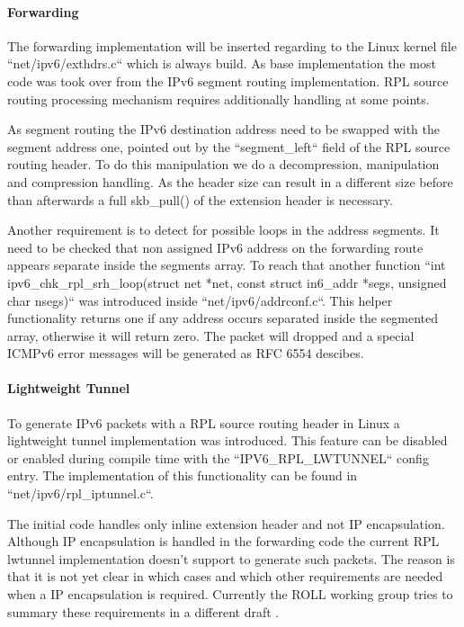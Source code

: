 \documentclass[letterpaper]{article}
\begin{document}
\paragraph{Forwarding}

The forwarding implementation will be inserted regarding to the Linux kernel file ``net/ipv6/exthdrs.c`` which is always build.
As base implementation the most code was took over from the IPv6 segment routing implementation.
RPL source routing processing mechanism requires additionally handling at some points.

As segment routing the IPv6 destination address need to be swapped with the segment address one, pointed out by the ``segment\_left`` field of the RPL source routing header.
To do this manipulation we do a decompression, manipulation and compression handling.
As the header size can result in a different size before than afterwards a full skb\_pull() of the extension header is necessary.

Another requirement is to detect for possible loops in the address segments.
It need to be checked that non assigned IPv6 address on the forwarding route appears separate inside the segments array.
To reach that another function ``int ipv6\_chk\_rpl\_srh\_loop(struct net *net, const struct in6\_addr *segs, unsigned char nsegs)`` was introduced inside ``net/ipv6/addrconf.c``.
This helper functionality returns one if any address occurs separated inside the segmented array, otherwise it will return zero.
The packet will dropped and a special ICMPv6 error messages will be generated as RFC 6554 descibes.

\paragraph{Lightweight Tunnel}

To generate IPv6 packets with a RPL source routing header in Linux a lightweight tunnel implementation was introduced.
This feature can be disabled or enabled during compile time with the ``IPV6\_RPL\_LWTUNNEL`` config entry.
The implementation of this functionality can be found in ``net/ipv6/rpl\_iptunnel.c``.

The initial code handles only inline extension header and not IP encapsulation.
Although IP encapsulation is handled in the forwarding code the current RPL lwtunnel implementation doesn't support to generate such packets.
The reason is that it is not yet clear in which cases and which other requirements are needed when a IP encapsulation is required.
Currently the ROLL working group tries to summary these requirements in a different draft \cite{I-D.ietf-roll-useofrplinfo}.
\end{document}
